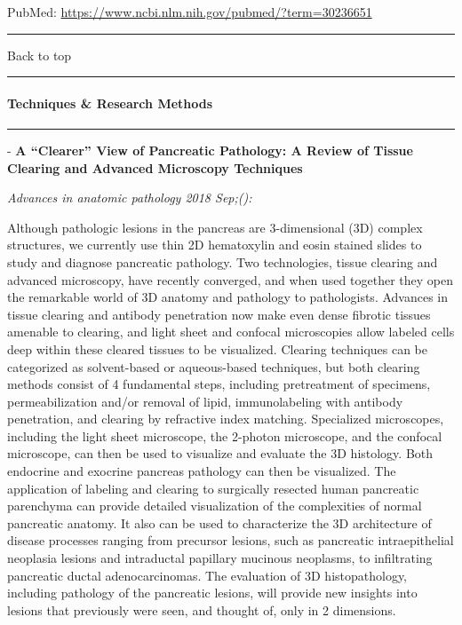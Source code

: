 \documentclass[]{article}
\let\oldparagraph\paragraph
\renewcommand{\paragraph}[1]{\oldparagraph{#1}\mbox{}}
\begin{document}
PubMed: \url{https://www.ncbi.nlm.nih.gov/pubmed/?term=30236651}

{}

{}

\begin{center}\rule{0.5\linewidth}{\linethickness}\end{center}

Back to top

\begin{center}\rule{0.5\linewidth}{\linethickness}\end{center}

\pagebreak

\hypertarget{techniques-research-methods}{%
\paragraph{Techniques \& Research
Methods}\label{techniques-research-methods}}

\begin{center}\rule{0.5\linewidth}{\linethickness}\end{center}

 - \textbf{A ``Clearer'' View of Pancreatic Pathology: A Review of
Tissue Clearing and Advanced Microscopy Techniques}

\emph{Advances in anatomic pathology 2018 Sep;():}

Although pathologic lesions in the pancreas are 3-dimensional (3D)
complex structures, we currently use thin 2D hematoxylin and eosin
stained slides to study and diagnose pancreatic pathology. Two
technologies, tissue clearing and advanced microscopy, have recently
converged, and when used together they open the remarkable world of 3D
anatomy and pathology to pathologists. Advances in tissue clearing and
antibody penetration now make even dense fibrotic tissues amenable to
clearing, and light sheet and confocal microscopies allow labeled cells
deep within these cleared tissues to be visualized. Clearing techniques
can be categorized as solvent-based or aqueous-based techniques, but
both clearing methods consist of 4 fundamental steps, including
pretreatment of specimens, permeabilization and/or removal of lipid,
immunolabeling with antibody penetration, and clearing by refractive
index matching. Specialized microscopes, including the light sheet
microscope, the 2-photon microscope, and the confocal microscope, can
then be used to visualize and evaluate the 3D histology. Both endocrine
and exocrine pancreas pathology can then be visualized. The application
of labeling and clearing to surgically resected human pancreatic
parenchyma can provide detailed visualization of the complexities of
normal pancreatic anatomy. It also can be used to characterize the 3D
architecture of disease processes ranging from precursor lesions, such
as pancreatic intraepithelial neoplasia lesions and intraductal
papillary mucinous neoplasms, to infiltrating pancreatic ductal
adenocarcinomas. The evaluation of 3D histopathology, including
pathology of the pancreatic lesions, will provide new insights into
lesions that previously were seen, and thought of, only in 2 dimensions.
\end{document}
